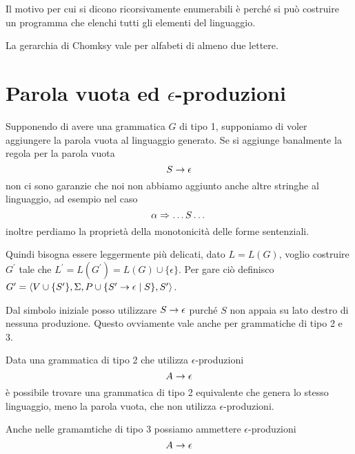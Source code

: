 \documentclass[12pt]{report}
\begin{document}
Il motivo per cui si dicono ricorsivamente enumerabili è perché si può costruire un programma che elenchi tutti gli elementi del linguaggio.

La gerarchia di Chomksy vale per alfabeti di almeno due lettere.

\section{Parola vuota ed $\epsilon$-produzioni}
Supponendo di avere una grammatica $G$ di tipo 1, supponiamo di voler aggiungere la parola vuota al linguaggio generato.
Se si aggiunge banalmente la regola per la parola vuota
$$ S \rightarrow \epsilon $$
non ci sono garanzie che noi non abbiamo aggiunto anche altre stringhe al linguaggio, ad esempio nel caso
$$ \alpha \Rightarrow \dots S \dots $$
inoltre perdiamo la proprietà della monotonicità delle forme sentenziali.

Quindi bisogna essere leggermente più delicati, dato $L = L(G)$, voglio costruire $G^\prime$ tale che $L^\prime = L(G^\prime) = L(G) \cup \{ \epsilon \}$.
Per gare ciò definisco $G^\prime = \langle V \cup \{S^\prime\}, \Sigma, P \cup \{ S^\prime \rightarrow \epsilon \mid S\}, S^\prime \rangle$.

Dal simbolo iniziale posso utilizzare $S \rightarrow \epsilon$ purché $S$ non appaia su lato destro di nessuna produzione.
Questo ovviamente vale anche per grammatiche di tipo 2 e 3.

Data una grammatica di tipo 2 che utilizza $\epsilon$-produzioni 
$$ A \rightarrow \epsilon $$
è possibile trovare una grammatica di tipo 2 equivalente che genera lo stesso linguaggio, meno la parola vuota, che non utilizza $\epsilon$-produzioni.

Anche nelle gramamtiche di tipo 3 possiamo ammettere $\epsilon$-produzioni
$$ A \rightarrow \epsilon $$
\end{document}
